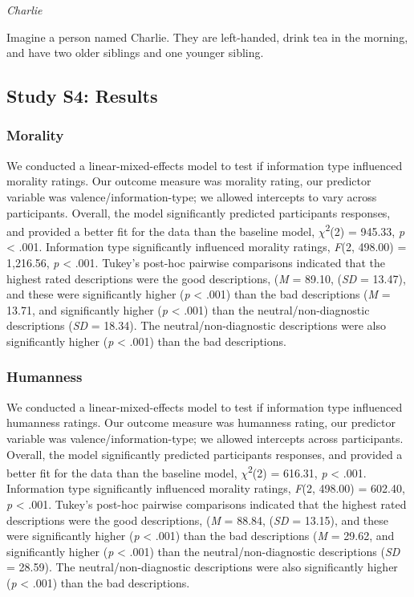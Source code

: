 \documentclass[
  man,floatsintext]{apa6}
\begin{document}
\emph{Charlie}

Imagine a person named Charlie.
They are left-handed, drink tea in the morning, and have two older siblings and one younger sibling.

\subsection{Study S4: Results}\label{study-s4-results}

\subsubsection{Morality}\label{morality}

We conducted a linear-mixed-effects model to test if information type influenced morality ratings. Our outcome measure was morality rating, our predictor variable was valence/information-type; we allowed intercepts to vary across participants.
Overall, the model significantly predicted participants responses, and provided a better fit for the data than the baseline model,
\(\chi\)\textsuperscript{2}(2) = 945.33,
\emph{p} \textless{} .001.
Information type significantly influenced morality ratings,
\emph{F}(2,
498.00) = 1,216.56,
\emph{p} \textless{} .001.
Tukey's post-hoc pairwise comparisons indicated that the highest rated descriptions were the good descriptions,
(\emph{M} = 89.10,
(\emph{SD} = 13.47), and these were significantly higher
(\emph{p} \textless{} .001) than the bad descriptions
(\emph{M} = 13.71, and significantly higher
(\emph{p} \textless{} .001) than the neutral/non-diagnostic descriptions
(\emph{SD} = 18.34). The neutral/non-diagnostic descriptions were also significantly higher
(\emph{p} \textless{} .001) than the bad descriptions.

\subsubsection{Humanness}\label{humanness}

We conducted a linear-mixed-effects model to test if information type influenced humanness ratings. Our outcome measure was humanness rating, our predictor variable was valence/information-type; we allowed intercepts across participants.
Overall, the model significantly predicted participants responses, and provided a better fit for the data than the baseline model,
\(\chi\)\textsuperscript{2}(2) = 616.31,
\emph{p} \textless{} .001.
Information type significantly influenced morality ratings,
\emph{F}(2,
498.00) = 602.40,
\emph{p} \textless{} .001.
Tukey's post-hoc pairwise comparisons indicated that the highest rated descriptions were the good descriptions,
(\emph{M} = 88.84,
(\emph{SD} = 13.15), and these were significantly higher
(\emph{p} \textless{} .001) than the bad descriptions
(\emph{M} = 29.62, and significantly higher
(\emph{p} \textless{} .001) than the neutral/non-diagnostic descriptions
(\emph{SD} = 28.59). The neutral/non-diagnostic descriptions were also significantly higher
(\emph{p} \textless{} .001) than the bad descriptions.
\end{document}
